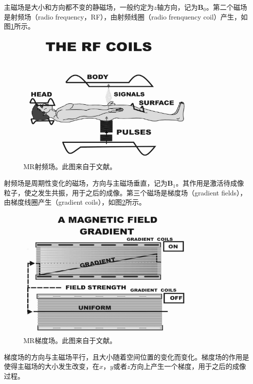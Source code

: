 主磁场是大小和方向都不变的静磁场，一般约定为$z$轴方向，记为$\mathrm{\textbf{B}}_0$。第二个磁场是射频场（radio frequency，RF），由射频线圈（radio frenquency coil）产生，如图\ref{fig:rf}所示。
\begin{figure}[htbp]
\centering
\includegraphics[width=0.8\textwidth]{img/intro/rf.eps}
\caption{MR射频场。此图来自于文献\cite{sprawls2000magnetic}。}
\label{fig:rf}
\end{figure}
射频场是周期性变化的磁场，方向与主磁场垂直，记为$\mathrm{\textbf{B}}_1$。其作用是激活待成像粒子，使之发生共振，用于之后的成像。第三个磁场是梯度场（gradient fields），由梯度线圈产生（gradient coils），如图\ref{fig:gradient}所示。
\begin{figure}[htbp]
\centering
\includegraphics[width=0.8\textwidth]{img/intro/gradient.eps}
\caption{MR梯度场。此图来自于文献\cite{sprawls2000magnetic}。}
\label{fig:gradient}
\end{figure}
梯度场的方向与主磁场平行，且大小随着空间位置的变化而变化。梯度场的作用是使得主磁场的大小发生改变，在$x$，$y$或者$z$方向上产生一个梯度，用于之后的成像过程。

